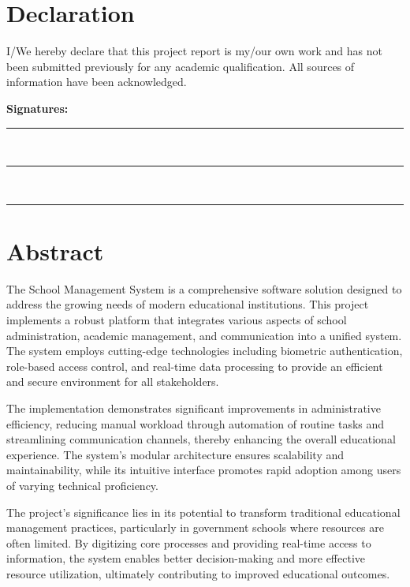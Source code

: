 \documentclass[12pt,a4paper]{report}
\begin{document}
\newpage
{} %


\section*{Declaration}
I/We hereby declare that this project report is my/our own work and has not been submitted previously for any academic qualification. All sources of information have been acknowledged.

\vspace{2cm}
\noindent\textbf{Signatures:}

\vspace{2cm}
\noindent\rule{6cm}{0.4pt}\\
\noindent\rule{6cm}{0.4pt}\\
\noindent\rule{6cm}{0.4pt}

\newpage
\section*{Abstract}
The School Management System is a comprehensive software solution designed to address the growing needs of modern educational institutions. This project implements a robust platform that integrates various aspects of school administration, academic management, and communication into a unified system. The system employs cutting-edge technologies including biometric authentication, role-based access control, and real-time data processing to provide an efficient and secure environment for all stakeholders.

The implementation demonstrates significant improvements in administrative efficiency, reducing manual workload through automation of routine tasks and streamlining communication channels, thereby enhancing the overall educational experience. The system's modular architecture ensures scalability and maintainability, while its intuitive interface promotes rapid adoption among users of varying technical proficiency.

The project's significance lies in its potential to transform traditional educational management practices, particularly in government schools where resources are often limited. By digitizing core processes and providing real-time access to information, the system enables better decision-making and more effective resource utilization, ultimately contributing to improved educational outcomes.
\end{document}
